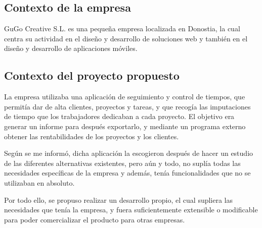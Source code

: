 \subsection{Contexto de la empresa}
\label{context:company}

GuGo Creative S.L. es una pequeña empresa localizada en Donostia, la
cual centra su actividad en el diseño y desarrollo de soluciones web
y también en el diseño y desarrollo de aplicaciones móviles.

\subsection{Contexto del proyecto propuesto}
La empresa utilizaba una aplicación de seguimiento y control de tiempos,
que permitía dar de alta clientes, proyectos y tareas, y que recogía
las imputaciones de tiempo que los trabajadores dedicaban a cada
proyecto. El objetivo era generar un informe para después exportarlo,
y mediante un programa externo obtener las rentabilidades de los
proyectos y los clientes.

Según se me informó, dicha aplicación la escogieron después de hacer un
estudio de las diferentes alternativas existentes, pero aún y todo, no
suplía todas las necesidades específicas de la empresa y además, tenía
funcionalidades que no se utilizaban en absoluto.

Por todo ello, se propuso realizar un desarrollo propio, el cual
supliera las necesidades que tenía la empresa, y fuera suficientemente
extensible o modificable para poder comercializar el producto para otras
empresas.
